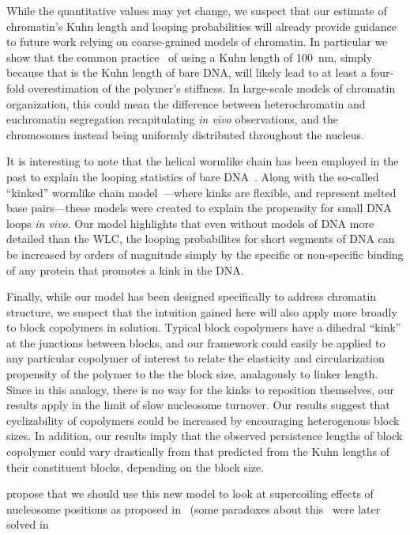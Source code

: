 \documentclass[%
 reprint,
superscriptaddress,
showpacs,preprintnumbers,
 amsmath,amssymb,
 aps,
 prl,
]{revtex4-1}
\begin{document}
While the quantitative values may yet change, we suspect that our estimate of
    chromatin's Kuhn length and looping probabilities will already provide
    guidance to future work relying on coarse-grained models of chromatin.
In particular we show that the common practice~\cite{macphersonInPress,nuebler2018}
    of using a Kuhn length of \SI{100}{\nano\metre}, simply because that is the
    Kuhn length of bare DNA, will likely lead to at least a four-fold
    overestimation of the polymer's stiffness.
In large-scale models of chromatin organization, this could mean the difference
    between heterochromatin and euchromatin segregation recapitulating
    \textit{in vivo} observations, and the chromosomes instead being uniformly
    distributed throughout the nucleus.

It is interesting to note that the helical wormlike chain has been employed
    in the past to explain the looping statistics of bare DNA~\cite{shimada1984,
    liu2011a}.
Along with the so-called ``kinked'' wormlike chain model~\cite{wiggins2005,
    popov2005}---where kinks are flexible, and represent melted base
    pairs---these models were created to explain the propensity for small DNA
    loops \textit{in vivo}.
Our model highlights that even without models of DNA more detailed than the WLC,
    the looping probabilites for short segments of DNA can be increased by
    orders of magnitude simply by the specific or non-specific binding of any
    protein that promotes a kink in the DNA.\@

Finally, while our model has been designed specifically to address chromatin
    structure, we suspect that the intuition gained here will also apply more
    broadly to block copolymers in solution.
Typical block copolymers have a dihedral ``kink'' at the junctions between
    blocks, and our framework could easily be applied to any particular
    copolymer of interest to relate the elasticity and circularization
    propensity of the polymer to the the block size, analagously to linker
    length.
Since in this analogy, there is no way for the kinks to reposition themselves,
    our results apply in the limit of slow nucleosome turnover.
Our results suggest that cyclizability of copolymers could be increased by
    encouraging heterogenous block sizes.
In addition, our results imply that the observed persistence lengths of block
    copolymer could vary drastically from that predicted from the Kuhn lengths
    of their constituent blocks, depending on the block size.

propose that we should use this new model to look at supercoiling effects
of nucleosome positions as proposed in~\cite{grigoryev1981} (some paradoxes
about this~\cite{prunell1998} were later solved in~\cite{nikitina2017}
\end{document}
